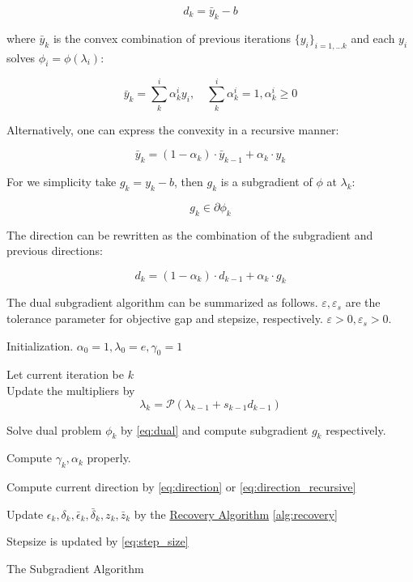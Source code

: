 \begin{equation}\label{eq:direction}
  d_k = \bar y_k - b
\end{equation}

where \(\bar y_k\) is the convex combination of previous iterations
\(\{y_i\}_{i=1,...k}\) and each \(y_i\) solves
\(\phi_i = \phi(\lambda_i)\):

\begin{equation}\bar y_k = \sum^i_k \alpha^i_k y_i,\quad  \sum^i_k \alpha^i_k = 1, \alpha^i_k \ge 0\end{equation}

Alternatively, one can express the convexity in a recursive manner:

\begin{equation}\bar y_k = (1-\alpha_k)\cdot\bar y_{k-1} + \alpha_k \cdot y_k \end{equation}

For we simplicity take \(g_k= y_k - b\), then \(g_k\) is a subgradient
of \(\phi\) at \(\lambda_k\):

\begin{equation}g_k \in \partial \phi_k\end{equation}

The direction can be rewritten as the combination of the subgradient and
previous directions:

\begin{equation}\label{eq:direction_recursive}
  d_k = (1-\alpha_k) \cdot d_{k-1} + \alpha_k\cdot g_k
\end{equation}


The dual subgradient algorithm can be summarized as follows.
\(\varepsilon,\varepsilon_s\) are the tolerance parameter for objective gap and stepsize, respectively.
\(\varepsilon > 0 ,\varepsilon_s > 0\).

\begin{algorithm}[H]
  \SetAlgoLined
  Initialization. \(\alpha_0 = 1, \lambda_0 = e, \gamma_0 = 1\)  \\
  {
    Let current iteration be \(k\)\\
    Update the multipliers by
    \[\lambda_{k} = \mathcal{P}(\lambda_{k-1} + s_{k-1}d_{k-1})\]

    Solve dual problem \(\phi_k\) by \eqref{eq:dual}
    and compute subgradient \(g_k\) respectively.

    Compute \(\gamma_k, \alpha_k\) properly.

    Compute current direction by \eqref{eq:direction} or \eqref{eq:direction_recursive}

    Update \(\epsilon_k,\delta_k ,\bar \epsilon_k ,\bar \delta_k, z_k, \bar z_k \)
    by the \underline{Recovery Algorithm} \ref{alg:recovery}

    Stepsize is updated by \eqref{eq:step_size}
  }
  \caption{The Subgradient Algorithm}
\end{algorithm}

